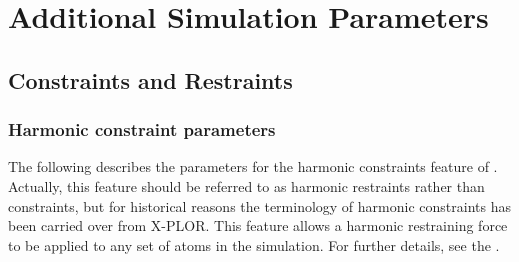 \section{Additional Simulation Parameters}
\label{section:add}


\subsection{Constraints and Restraints}
\label{section:config_add}

\subsubsection{Harmonic constraint parameters}

The following describes the parameters for the 
harmonic constraints feature of \NAMD.  Actually, this feature 
should be referred to as harmonic restraints rather than 
constraints, but for historical reasons the terminology of 
harmonic constraints has been carried over from X-PLOR.  
This feature allows a harmonic restraining force to be applied 
to any set of atoms in the simulation.  For further details, 
see the \PG.  

